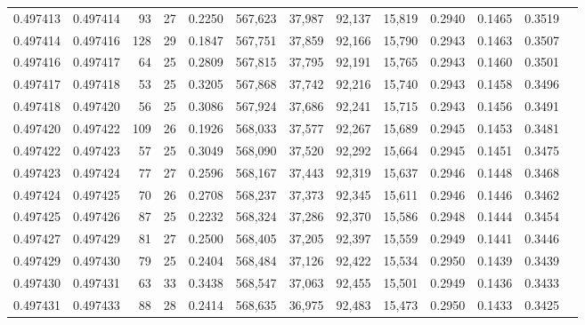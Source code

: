 \begin{tabular}{rrrrrrrrrrrrr}
0.497413 & 0.497414 &  93 &  27 &                                     0.2250 & 567,623 &  37,987 &  92,137 &  15,819 & 0.2940 & 0.1465 & 0.3519 \\
0.497414 & 0.497416 & 128 &  29 &                                     0.1847 & 567,751 &  37,859 &  92,166 &  15,790 & 0.2943 & 0.1463 & 0.3507 \\
0.497416 & 0.497417 &  64 &  25 &                                     0.2809 & 567,815 &  37,795 &  92,191 &  15,765 & 0.2943 & 0.1460 & 0.3501 \\
0.497417 & 0.497418 &  53 &  25 &                                     0.3205 & 567,868 &  37,742 &  92,216 &  15,740 & 0.2943 & 0.1458 & 0.3496 \\
0.497418 & 0.497420 &  56 &  25 &                                     0.3086 & 567,924 &  37,686 &  92,241 &  15,715 & 0.2943 & 0.1456 & 0.3491 \\
0.497420 & 0.497422 & 109 &  26 &                                     0.1926 & 568,033 &  37,577 &  92,267 &  15,689 & 0.2945 & 0.1453 & 0.3481 \\
0.497422 & 0.497423 &  57 &  25 &                                     0.3049 & 568,090 &  37,520 &  92,292 &  15,664 & 0.2945 & 0.1451 & 0.3475 \\
0.497423 & 0.497424 &  77 &  27 &                                     0.2596 & 568,167 &  37,443 &  92,319 &  15,637 & 0.2946 & 0.1448 & 0.3468 \\
0.497424 & 0.497425 &  70 &  26 &                                     0.2708 & 568,237 &  37,373 &  92,345 &  15,611 & 0.2946 & 0.1446 & 0.3462 \\
0.497425 & 0.497426 &  87 &  25 &                                     0.2232 & 568,324 &  37,286 &  92,370 &  15,586 & 0.2948 & 0.1444 & 0.3454 \\
0.497427 & 0.497429 &  81 &  27 &                                     0.2500 & 568,405 &  37,205 &  92,397 &  15,559 & 0.2949 & 0.1441 & 0.3446 \\
0.497429 & 0.497430 &  79 &  25 &                                     0.2404 & 568,484 &  37,126 &  92,422 &  15,534 & 0.2950 & 0.1439 & 0.3439 \\
0.497430 & 0.497431 &  63 &  33 &                                     0.3438 & 568,547 &  37,063 &  92,455 &  15,501 & 0.2949 & 0.1436 & 0.3433 \\
0.497431 & 0.497433 &  88 &  28 &                                     0.2414 & 568,635 &  36,975 &  92,483 &  15,473 & 0.2950 & 0.1433 & 0.3425 \\

\end{tabular}
